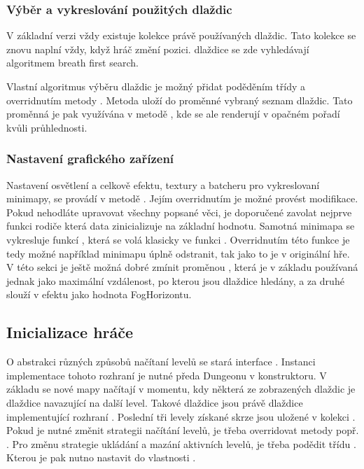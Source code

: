 \subsubsection{Výběr a vykreslování použitých dlaždic}
V základní verzi vždy existuje kolekce právě používaných dlaždic. Tato kolekce se znovu naplní vždy, když hráč změní
pozici. dlaždice se zde vyhledávají algoritmem breath first search.

Vlastní algoritmus výběru dlaždic je možný přidat poděděním třídy  a overridnutím  metody . 
Metoda uloží do proměnné  vybraný seznam dlaždic. Tato proměnná je pak využívána v metodě , kde se
ale renderují v opačném pořadí kvůli průhlednosti.


\subsubsection{Nastavení grafického zařízení}
Nastavení osvětlení a celkově efektu, textury a batcheru pro vykreslovaní minimapy, se provádí v metodě .
Jejím overridnutím je možné provést modifikace. Pokud nehodláte upravovat všechny popsané věci, je doporučené zavolat nejprve funkci rodiče
která data zinicializuje na základní hodnotu. Samotná minimapa se vykresluje funkcí , která se volá klasicky ve funkci 
. Overridnutím této funkce je tedy možné například minimapu úplně odstranit, tak jako to je v originální hře. V této sekci je ještě
možná dobré zmínit proměnou , která je v základu používaná jednak jako maximální vzdálenost, po kterou jsou dlaždice hledány, a za druhé slouží v efektu jako 
hodnota FogHorizontu.

\subsection{Inicializace hráče}
O abstrakci různých způsobů načítaní levelů se stará interface . Instanci implementace tohoto
rozhraní je nutné předa Dungeonu v konstruktoru. V základu se nové mapy načítají v momentu, kdy některá ze zobrazených
dlaždic je dlaždice navazující na další level. Takové dlaždice jsou právě dlaždice implementující  rozhraní  .
Poslední tři levely získané skrze  jsou uložené v kolekci . Pokud je nutné změnit 
strategii načítání levelů, je třeba overridovat metody  popř. . Pro změnu 
strategie ukládání a mazání aktivních levelů, je třeba podědit třídu . Kterou je pak nutno nastavit
do vlastnosti . 

